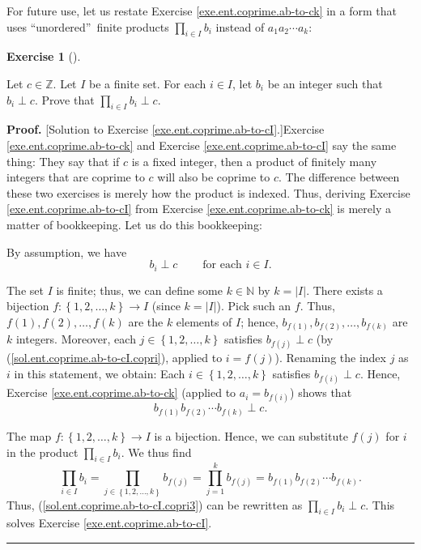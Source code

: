 \documentclass[numbers=enddot,12pt,final,onecolumn,notitlepage]{scrartcl}%
\newcounter{exer}
\numberwithin{exer}{subsection}
\theoremstyle{definition}
\newtheorem{exmp}[exer]{Exercise}
\newenvironment{exercise}[1][]
{\begin{exmp}[#1]\begin{leftbar}}
{\end{leftbar}\end{exmp}}
\newenvironment{fineprint}{\begin{small}}{\end{small}}
\newenvironment{proof}[1][Proof]{\noindent\textbf{#1.} }{\ \rule{0.5em}{0.5em}}
\let\prodnonlimits\prod
\renewcommand{\prod}{\prodnonlimits\limits}
\begin{document}
For future use, let us restate Exercise \ref{exe.ent.coprime.ab-to-ck} in a
form that uses \textquotedblleft unordered\textquotedblright\ finite products
$\prod_{i\in I}b_{i}$ instead of $a_{1}a_{2}\cdots a_{k}$:

\begin{exercise}
\label{exe.ent.coprime.ab-to-cI}Let $c\in\mathbb{Z}$. Let $I$ be a finite set.
For each $i\in I$, let $b_{i}$ be an integer such that $b_{i}\perp c$. Prove
that $\prod_{i\in I}b_{i}\perp c$.
\end{exercise}

\begin{fineprint}
\begin{proof}
[Solution to Exercise \ref{exe.ent.coprime.ab-to-cI}.]Exercise
\ref{exe.ent.coprime.ab-to-ck} and Exercise \ref{exe.ent.coprime.ab-to-cI} say
the same thing: They say that if $c$ is a fixed integer, then a product of
finitely many integers that are coprime to $c$ will also be coprime to $c$.
The difference between these two exercises is merely how the product is
indexed. Thus, deriving Exercise \ref{exe.ent.coprime.ab-to-cI} from Exercise
\ref{exe.ent.coprime.ab-to-ck} is merely a matter of bookkeeping. Let us do
this bookkeeping:

By assumption, we have
\begin{equation}
b_{i}\perp c\ \ \ \ \ \ \ \ \ \ \text{for each }i\in I.
\label{sol.ent.coprime.ab-to-cI.copri}%
\end{equation}


The set $I$ is finite; thus, we can define some $k\in\mathbb{N}$ by
$k=\left\vert I\right\vert $. There exists a bijection $f:\left\{
1,2,\ldots,k\right\}  \rightarrow I$ (since $k=\left\vert I\right\vert $).
Pick such an $f$. Thus, $f\left(  1\right)  ,f\left(  2\right)  ,\ldots
,f\left(  k\right)  $ are the $k$ elements of $I$; hence, $b_{f\left(
1\right)  },b_{f\left(  2\right)  },\ldots,b_{f\left(  k\right)  }$ are $k$
integers. Moreover, each $j\in\left\{  1,2,\ldots,k\right\}  $ satisfies
$b_{f\left(  j\right)  }\perp c$ (by (\ref{sol.ent.coprime.ab-to-cI.copri}),
applied to $i=f\left(  j\right)  $). Renaming the index $j$ as $i$ in this
statement, we obtain: Each $i\in\left\{  1,2,\ldots,k\right\}  $ satisfies
$b_{f\left(  i\right)  }\perp c$. Hence, Exercise
\ref{exe.ent.coprime.ab-to-ck} (applied to $a_{i}=b_{f\left(  i\right)  }$)
shows that
\begin{equation}
b_{f\left(  1\right)  }b_{f\left(  2\right)  }\cdots b_{f\left(  k\right)
}\perp c. \label{sol.ent.coprime.ab-to-cI.copri3}%
\end{equation}


The map $f:\left\{  1,2,\ldots,k\right\}  \rightarrow I$ is a bijection.
Hence, we can substitute $f\left(  j\right)  $ for $i$ in the product
$\prod_{i\in I}b_{i}$. We thus find%
\[
\prod_{i\in I}b_{i}=\prod_{j\in\left\{  1,2,\ldots,k\right\}  }b_{f\left(
j\right)  }=\prod_{j=1}^{k}b_{f\left(  j\right)  }=b_{f\left(  1\right)
}b_{f\left(  2\right)  }\cdots b_{f\left(  k\right)  }.
\]
Thus, (\ref{sol.ent.coprime.ab-to-cI.copri3}) can be rewritten as $\prod_{i\in
I}b_{i}\perp c$. This solves Exercise \ref{exe.ent.coprime.ab-to-cI}.
\end{proof}
\end{fineprint}
\end{document}
